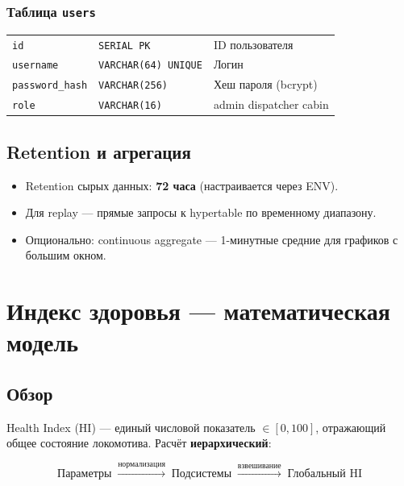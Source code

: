 \documentclass[12pt,a4paper]{article}
\newcommand{\code}[1]{\texttt{#1}}
\begin{document}
\subsubsection*{Таблица \code{users}}

\begin{tabularx}{\textwidth}{l l X}
\toprule
\code{id} & \code{SERIAL PK} & ID пользователя \\
\code{username} & \code{VARCHAR(64) UNIQUE} & Логин \\
\code{password\_hash} & \code{VARCHAR(256)} & Хеш пароля (bcrypt) \\
\code{role} & \code{VARCHAR(16)} & admin \textbar{} dispatcher \textbar{} cabin \\
\bottomrule
\end{tabularx}

\subsection{Retention и агрегация}

\begin{itemize}[nosep]
  \item Retention сырых данных: \textbf{72 часа} (настраивается через ENV).
  \item Для replay --- прямые запросы к hypertable по временному диапазону.
  \item Опционально: continuous aggregate --- 1-минутные средние для графиков с большим окном.
\end{itemize}


\section{Индекс здоровья --- математическая модель}
\label{sec:health-index}

\subsection{Обзор}

Health Index (HI) --- единый числовой показатель $\in [0, 100]$, отражающий общее состояние локомотива. Расчёт \textbf{иерархический}:

\[
\text{Параметры} \;\xrightarrow{\text{нормализация}}\; \text{Подсистемы} \;\xrightarrow{\text{взвешивание}}\; \text{Глобальный HI}
\]
\end{document}
